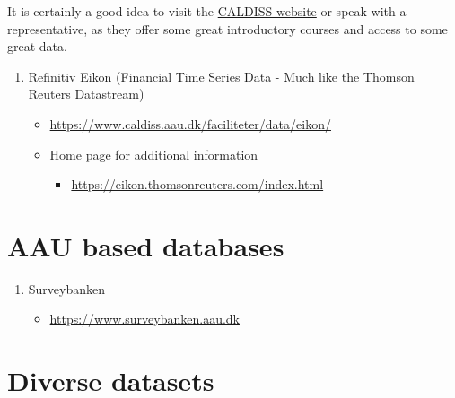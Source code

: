 \documentclass[
]{book}
\providecommand{\tightlist}{%
  \setlength{\itemsep}{0pt}\setlength{\parskip}{0pt}}
\begin{document}
It is certainly a good idea to visit the \href{https://www.caldiss.aau.dk}{CALDISS website} or speak with a representative, as they offer some great introductory courses and access to some great data.

\begin{enumerate}
\def\labelenumi{\arabic{enumi}.}
\tightlist
\item
  Refinitiv Eikon (Financial Time Series Data - Much like the Thomson Reuters Datastream)

  \begin{itemize}
  \tightlist
  \item
    \url{https://www.caldiss.aau.dk/faciliteter/data/eikon/}
  \item
    Home page for additional information

    \begin{itemize}
    \tightlist
    \item
      \url{https://eikon.thomsonreuters.com/index.html}
    \end{itemize}
  \end{itemize}
\end{enumerate}

\hypertarget{aau-based-databases}{%
\section{AAU based databases}\label{aau-based-databases}}

\begin{enumerate}
\def\labelenumi{\arabic{enumi}.}
\tightlist
\item
  Surveybanken

  \begin{itemize}
  \tightlist
  \item
    \url{https://www.surveybanken.aau.dk}
  \end{itemize}
\end{enumerate}

\hypertarget{diverse-datasets}{%
\section{Diverse datasets}\label{diverse-datasets}}
\end{document}
